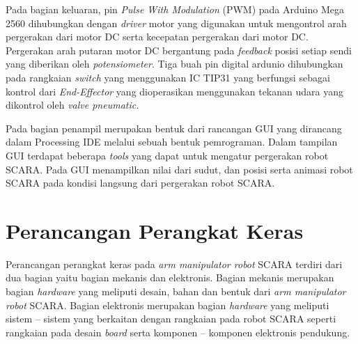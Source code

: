Pada bagian keluaran, pin \textit{Pulse With Modulation} (PWM) pada Arduino Mega 2560 dihubungkan dengan \textit{driver} motor yang digunakan untuk mengontrol arah pergerakan dari motor DC serta kecepatan pergerakan dari motor DC. Pergerakan arah putaran motor DC bergantung pada \textit{feedback} posisi setiap sendi yang diberikan oleh \textit{potensiometer}. Tiga buah pin digital ardunio dihubungkan pada rangkaian \textit{switch} yang menggunakan IC TIP31 yang berfungsi sebagai kontrol dari \textit{End-Effector} yang dioperasikan menggunakan tekanan udara yang dikontrol oleh \textit{valve pneumatic.}

Pada bagian penampil merupakan bentuk dari rancangan GUI yang dirancang dalam Processing IDE melalui sebuah bentuk pemrograman. Dalam tampilan GUI terdapat beberapa \textit{tools} yang dapat untuk mengatur pergerakan robot SCARA. Pada GUI menampilkan nilai dari sudut, dan posisi serta animasi robot SCARA pada kondisi langsung dari pergerakan robot SCARA.
\section{ Perancangan Perangkat Keras }
Perancangan perangkat keras pada \textit{arm manipulator robot} SCARA terdiri dari dua bagian yaitu bagian mekanis dan elektronis. Bagian  mekanis merupakan bagian \textit{hardware} yang meliputi desain, bahan dan bentuk dari\textit{ arm manipulator robot} SCARA. Bagian elektronis merupakan bagian \textit{hardware} yang meliputi sistem – sistem yang berkaitan dengan rangkaian pada robot SCARA seperti rangkaian pada desain \textit{board} serta komponen – komponen elektronis pendukung.
